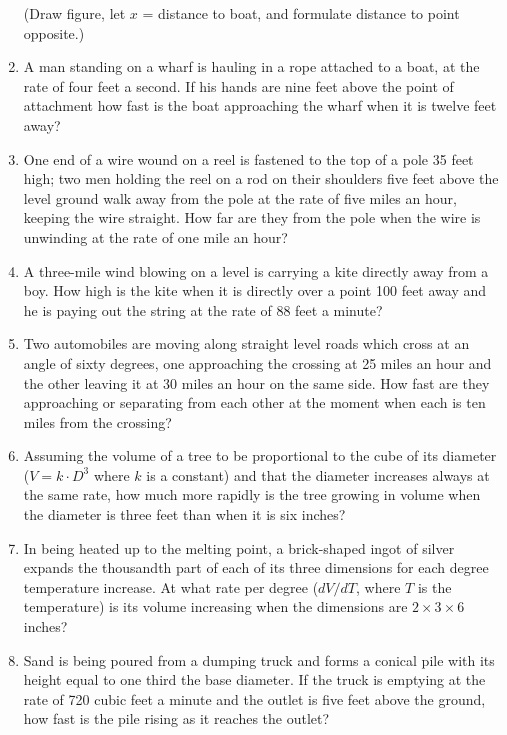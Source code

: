 \begin{enumerate}
    (Draw figure, let $x$ = distance to boat, and formulate distance to point opposite.)

    \item A man standing on a wharf is hauling in a rope attached to a boat, at the rate of four feet a second. If his hands are nine feet above the point of attachment how fast is the boat approaching the wharf when it is twelve feet away?

    \item One end of a wire wound on a reel is fastened to the top of a pole 35 feet high; two men holding the reel on a rod on their shoulders five feet above the level ground walk away from the pole at the rate of five miles an hour, keeping the wire straight. How far are they from the pole when the wire is unwinding at the rate of one mile an hour?

    \item A three-mile wind blowing on a level is carrying a kite directly away from a boy. How high is the kite when it is directly over a point 100 feet away and he is paying out the string at the rate of 88 feet a minute?

    \item Two automobiles are moving along straight level roads which cross at an angle of sixty degrees, one approaching the crossing at 25 miles an hour and the other leaving it at 30 miles an hour on the same side. How fast are they approaching or separating from each other at the moment when each is ten miles from the crossing?

    \item Assuming the volume of a tree to be proportional to the cube of its diameter ($V = k\cdot D^3$ where $k$ is a constant) and that the diameter increases always at the same rate, how much more rapidly is the tree growing in volume when the diameter is three feet than when it is six inches?

    \item In being heated up to the melting point, a brick-shaped ingot of silver expands the thousandth part of each of its three dimensions for each degree temperature increase. At what rate per degree ($dV/dT$, where $T$ is the temperature) is its volume increasing when the dimensions are $2 \times 3 \times 6$ inches?

    \item Sand is being poured from a dumping truck and forms a conical pile with its height equal to one third the base diameter. If the truck is emptying at the rate of 720 cubic feet a minute and the outlet is five feet above the ground, how fast is the pile rising as it reaches the outlet?


\end{enumerate}
